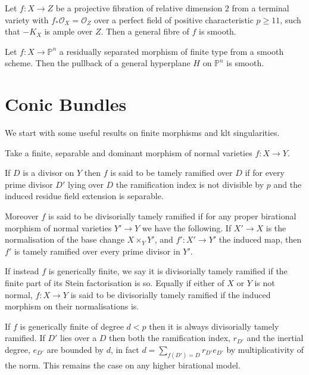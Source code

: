 \documentclass[a4paper,12pt]{book}
\newcommand{\ox}{\mathcal{O}_{X}}
\begin{document}
\begin{theorem}\cite[Corollary 1.6]{patakfalvi2017singularities}\label{smoothness}
	Let $f\colon X \to Z$ be a projective fibration of relative dimension $2$ from a terminal variety with $f_{*}\ox=\mathcal{O}_{Z}$ over a perfect field of positive characteristic $p \geq 11$, such that $-K_{X}$ is ample over $Z$. Then a general fibre of $f$ is smooth.
\end{theorem}

\begin{theorem}\cite[Theorem 1]{cumino1986axiomatic}\label{Bertini}
	Let $f\colon X \to \mathbb{P}^{n}$ a residually separated morphism of finite type from a smooth scheme. Then the pullback of a general hyperplane $H$ on $\mathbb{P}^{n}$ is smooth.
\end{theorem}



\section{Conic Bundles}
We start with some useful results on finite morphisms and klt singularities.

\begin{definition}
	Take a finite, separable and dominant morphism of normal varieties $f\colon X \to Y$.
	
	If $D$ is a divisor on $Y$ then $f$ is said to be tamely ramified over $D$ if for every prime divisor $D'$ lying over $D$ the ramification index is not divisible by $p$ and the induced residue field extension is separable.
	
	Moreover $f$ is said to be divisorially tamely ramified if for any proper birational morphism of normal varieties $Y' \to Y$ we have the following. If $X' \to X$ is the normalisation of the base change $X\times_{Y}Y'$, and $f'\colon X'\to Y'$  the induced map, then $f'$ is tamely ramified over every prime divisor in $Y'$.
	
	If instead $f$ is generically finite, we say it is divisorially tamely ramified if the finite part of its Stein factorisation is so. Equally if either of $X$ or $Y$ is not normal, $f\colon X \to Y$ is said to be divisorially tamely ramified if the induced morphism on their normalisations is.
\end{definition}

If $f$ is generically finite of degree $d <p$ then it is always divisorially tamely ramified. If $D'$ lies over a $D$ then both the ramification index, $r_{D'}$ and the inertial degree, $e_{D'}$ are bounded by $d$, in fact $d= \sum_{f(D')=D} r_{D'}e_{D'}$ by multiplicativity of the norm. This remains the case on any higher birational model.
\end{document}
